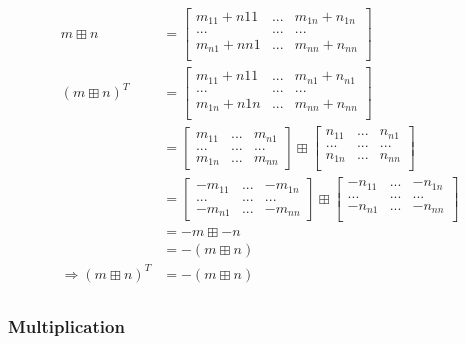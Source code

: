 \documentclass{article}
\begin{document}
\begin{equation}
\tag{1.2.2}
\begin{split}
m \boxplus n &= \begin{bmatrix}
m_{11}+n{11}&...&m_{1n}+n_{1n}\\
...&...&...\\
m_{n1}+n{n1}&...&m_{nn}+n_{nn}\\
\end{bmatrix}\\
(m \boxplus n)^T&= \begin{bmatrix}
m_{11}+n{11}&...&m_{n1}+n_{n1}\\
...&...&...\\
m_{1n}+n{1n}&...&m_{nn}+n_{nn}\\
\end{bmatrix}\\
&= \begin{bmatrix}
m_{11}&...&m_{n1}\\
...&...&...\\
m_{1n}&...&m_{nn}
\end{bmatrix}
\boxplus \begin{bmatrix}
n_{11}&...&n_{n1}\\
...&...&...\\
n_{1n}&...&n_{nn}\\
\end{bmatrix}\\
&=\begin{bmatrix}
-m_{11}&...&-m_{1n}\\
...&...&...\\
-m_{n1}&...&-m_{nn}
\end{bmatrix}
\boxplus \begin{bmatrix}
-n_{11}&...&-n_{1n}\\
...&...&...\\
-n_{n1}&...&-n_{nn}\\
\end{bmatrix}\\
&=-m \boxplus -n \\
&=- (m\boxplus n)\\
\Rightarrow (m\boxplus n)^T &= -(m\boxplus n)\\
\end{split}
\end{equation}

\subsubsection{Multiplication}
\end{document}
